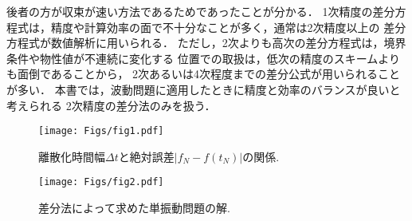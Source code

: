 \documentclass[10pt,a4j,dvipdfmx]{jarticle}
\begin{document}
後者の方が収束が速い方法であるためであったことが分かる．
1次精度の差分方程式は，精度や計算効率の面で不十分なことが多く，通常は2次精度以上の
差分方程式が数値解析に用いられる．
ただし，2次よりも高次の差分方程式は，境界条件や物性値が不連続に変化する
位置での取扱は，低次の精度のスキームよりも面倒であることから，
2次あるいは4次程度までの差分公式が用いられることが多い．
本書では，波動問題に適用したときに精度と効率のバランスが良いと考えられる
2次精度の差分法のみを扱う．
\begin{figure}[h]
	\begin{center}
	\texttt{[image: Figs/fig1.pdf]} 
	\end{center}
	\caption{離散化時間幅$\Delta t$と絶対誤差$\left| f_N-f(t_N)\right|$の関係.} 
	\label{fig:fig1}
\end{figure}
\begin{figure}[h]
	\begin{center}
	\texttt{[image: Figs/fig2.pdf]} 
	\end{center}
	\caption{差分法によって求めた単振動問題の解.} 
	\label{fig:fig2}
\end{figure}
\\
\end{document}
